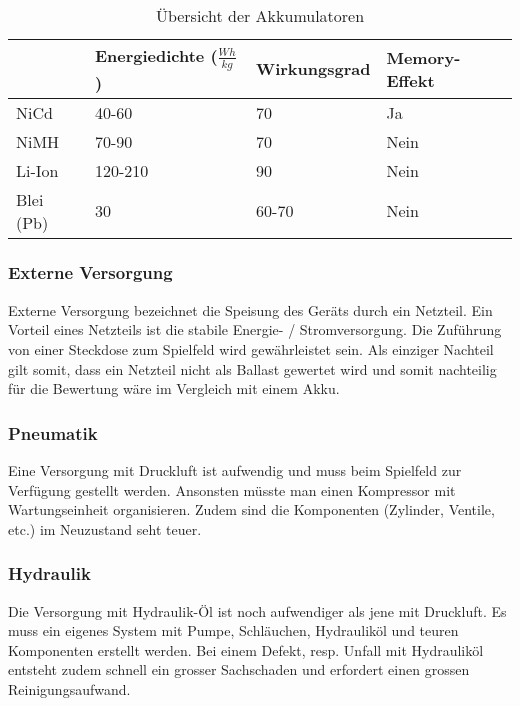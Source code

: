 \begin{table}[h!]
	\begin{tabular}{|p{1.5cm}|p{3.4cm}|p{2.6cm}|p{2.8cm}|} \hline
		          &\textbf{Energiedichte} ($\frac{Wh}{kg}$)  & \textbf{Wirkungsgrad} & \textbf{Memory-Effekt}\\ \hline
		NiCd      & 40-60                                    & 70                    & Ja \\ \hline
		NiMH      & 70-90                                    & 70                    & Nein  \\ \hline
		Li-Ion    & 120-210                                  & 90                    & Nein \\ \hline
		Blei (Pb) & 30                                       & 60-70                 & Nein \\ \hline
	\end{tabular}
	\centering
	\caption{Übersicht der Akkumulatoren}
	\label{tab:UebersichtAkku} 
\end{table}

\subsubsection{Externe Versorgung}
Externe Versorgung bezeichnet die Speisung des Geräts durch ein Netzteil. Ein Vorteil eines Netzteils ist die stabile Energie- / Stromversorgung. Die Zuführung von einer Steckdose zum Spielfeld wird gewährleistet sein. Als einziger Nachteil gilt somit, dass ein Netzteil nicht als Ballast gewertet wird und somit nachteilig für die Bewertung wäre im Vergleich mit einem Akku.

\subsubsection{Pneumatik}
Eine Versorgung mit Druckluft ist aufwendig und muss beim Spielfeld zur Verfügung gestellt werden. Ansonsten müsste man einen Kompressor mit Wartungseinheit organisieren. Zudem sind die Komponenten (Zylinder, Ventile, etc.) im Neuzustand seht teuer.

\subsubsection{Hydraulik}
Die Versorgung mit Hydraulik-Öl ist noch aufwendiger als jene mit Druckluft. Es muss ein eigenes System mit Pumpe, Schläuchen, Hydrauliköl und teuren Komponenten erstellt werden. Bei einem Defekt, resp. Unfall mit Hydrauliköl entsteht zudem schnell ein grosser Sachschaden und erfordert einen grossen Reinigungsaufwand. 


